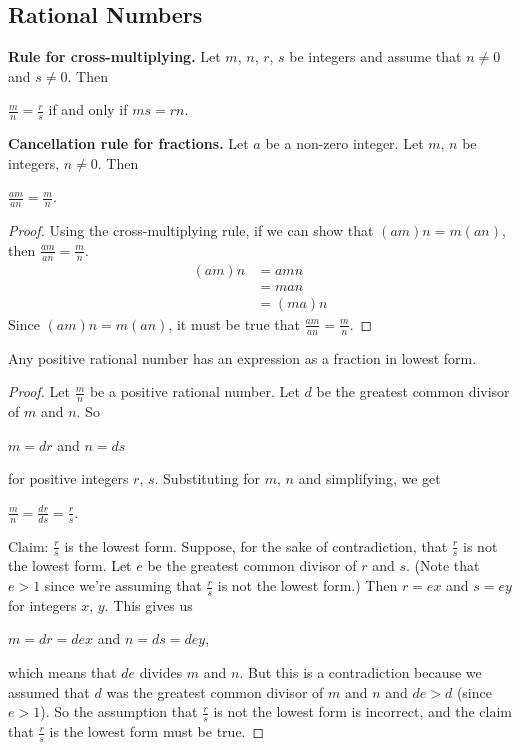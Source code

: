 \documentclass[12pt]{article}
\begin{document}
\subsection{Rational Numbers}
\textbf{Rule for cross-multiplying.} Let $m$, $n$, $r$, $s$ be integers and assume that $n\neq0$ and $s\neq0$. Then
\begin{center}
$\displaystyle \frac{m}{n}=\displaystyle \frac{r}{s}$ if and only if $ms=rn$.
\end{center}
\textbf{Cancellation rule for fractions.} Let $a$ be a non-zero integer. Let $m$, $n$ be integers, $n\neq0$. Then
\begin{center}
$\displaystyle \frac{am}{an}=\displaystyle \frac{m}{n}$.
\end{center}
\begin{proof}
Using the cross-multiplying rule, if we can show that $(am)n=m(an)$, then $\displaystyle \frac{am}{an}=\displaystyle \frac{m}{n}$.
\begin{align*}
(am)n&=amn \\
&=man \\
&=(ma)n
\end{align*}
Since $(am)n=m(an)$, it must be true that $\displaystyle \frac{am}{an}=\displaystyle \frac{m}{n}$.
\end{proof}
\begin{theorem}
Any positive rational number has an expression as a fraction in lowest form.
\end{theorem}
\begin{proof}
Let $\displaystyle \frac{m}{n}$ be a positive rational number. Let $d$ be the greatest common divisor of $m$ and $n$. So
\begin{center}
$m=dr$ and $n=ds$
\end{center}
for positive integers $r$, $s$. Substituting for $m$, $n$ and simplifying, we get
\begin{center}
$\displaystyle \frac{m}{n}=\frac{dr}{ds}=\frac{r}{s}$.
\end{center}
Claim: $\displaystyle \frac{r}{s}$ is the lowest form. Suppose, for the sake of contradiction, that $\displaystyle \frac{r}{s}$ is not the lowest form. Let $e$ be the greatest common divisor of $r$ and $s$. (Note that $e>1$ since we're assuming that $\displaystyle \frac{r}{s}$ is not the lowest form.) Then $r=ex$ and $s=ey$ for integers $x$, $y$. This gives us
\begin{center}
$m=dr=dex$ and $n=ds=dey$,
\end{center}
which means that $de$ divides $m$ and $n$. But this is a contradiction because we assumed that $d$ was the greatest common divisor of $m$ and $n$ and $de>d$ (since $e>1$). So the assumption that $\displaystyle \frac{r}{s}$ is not the lowest form is incorrect, and the claim that $\displaystyle \frac{r}{s}$ is the lowest form must be true.
\end{proof}
\end{document}

